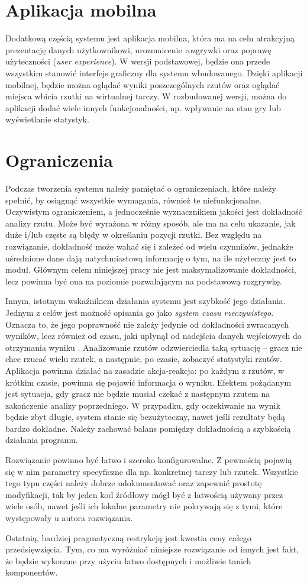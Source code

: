 \section{Aplikacja mobilna}
Dodatkową częścią systemu jest aplikacja mobilna, która ma na celu atrakcyjną prezentację danych użytkownikowi, urozmaicenie rozgrywki oraz poprawę użyteczności (\textit{user experience}). W wersji podstawowej, będzie ona przede wszystkim stanowić interfejs graficzny dla systemu wbudowanego. Dzięki aplikacji mobilnej, będzie można oglądać wyniki poszczególnych rzutów oraz oglądać miejsca wbicia rzutki na wirtualnej tarczy. W rozbudowanej wersji, można do aplikacji dodać wiele innych funkcjonalności, np. wpływanie na stan gry lub wyświetlanie statystyk. 
 
\section{Ograniczenia}
Podczas tworzenia systemu należy pamiętać o ograniczeniach, które należy spełnić, by osiągnąć wszystkie wymagania, również te niefunkcjonalne. Oczywistym ograniczeniem, a jednocześnie wyznacznikiem jakości jest dokładność analizy rzutu. Może być wyrażona w różny sposób, ale ma na celu ukazanie, jak duże i/lub częste są błędy w określaniu pozycji rzutki. Bez względu na rozwiązanie, dokładność może wahać się i zależeć od wielu czynników, jednakże uśrednione dane dają natychmiastową informację o tym, na ile użyteczny jest to moduł. Głównym celem niniejszej pracy nie jest maksymalizowanie dokładności, lecz powinna być ona na poziomie pozwalającym na podstawową rozgrywkę.  

Innym, istotnym wskaźnikiem działania systemu jest szybkość jego działania. Jednym z celów jest możność opisania go jako \textit{system czasu rzeczywistego}. Oznacza to, że jego poprawność nie zależy jedynie od dokładności zwracanych wyników, lecz również od czasu, jaki upłynął od nadejścia danych wejściowych do otrzymania wyniku \cite{Realtime}. Analizowanie rzutów odzwierciedla taką sytuację -- gracz nie chce rzucać wielu rzutek, a następnie, po czasie, zobaczyć statystyki rzutów. Aplikacja powinna działać na zasadzie akcja-reakcja: po każdym z rzutów, w krótkim czasie, powinna się pojawić informacja o wyniku. Efektem pożądanym jest sytuacja, gdy gracz nie będzie musiał czekać z następnym rzutem na zakończenie analizy poprzedniego. W przypadku, gdy oczekiwanie na wynik będzie zbyt długie, system stanie się bezużyteczny, nawet jeśli rezultaty będą bardzo dokładne. Należy zachować balans pomiędzy dokładnością a szybkością działania programu.

Rozwiązanie powinno być łatwo i szeroko konfigurowalne. Z pewnością pojawią się w nim parametry specyficzne dla np. konkretnej tarczy lub rzutek. Wszystkie tego typu części należy dobrze udokumentować oraz zapewnić prostotę modyfikacji, tak by jeden kod źródłowy mógł być z łatwością używany przez wiele osób, nawet jeśli ich lokalne parametry nie pokrywają się z tymi, które występowały u autora rozwiązania. 

Ostatnią, bardziej pragmatyczną restrykcją jest kwestia ceny całego przedsięwzięcia. Tym, co ma wyróżniać niniejsze rozwiązanie od innych jest fakt, że będzie wykonane przy użyciu łatwo dostępnych i możliwie tanich komponentów.
